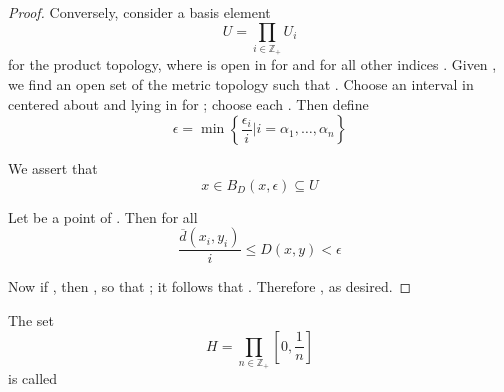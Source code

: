 \begin{proof}
      Conversely, consider a basis element
      \begin{equation*}
            U = \prod_{i \in \mathbb{Z}_{+}} U_{i}
      \end{equation*}
      for the product topology, where  is open in  for  and  for all other indices . Given , we find an open set  of the metric topology such that . Choose an interval  in  centered about  and lying in  for ; choose each . Then define
      \begin{equation*}
            \epsilon = \min \left\{
                  \frac{\epsilon_{i}}{i} | i = \alpha_{1},\dots,\alpha_{n}
            \right\}
      \end{equation*}

      We assert that
      \begin{equation*}
            x \in B_{D}(x,\epsilon) \subseteq U
      \end{equation*}

      Let  be a point of . Then for all 
      \begin{equation*}
            \frac{\overline{d}(x_{i},y_{i})}{i} \le D(x,y) < \epsilon
      \end{equation*}

      Now if , then , so that ; it follows that . Therefore , as desired.

\end{proof}

\begin{definition}\label{def:HilbertCube}
      The set
      \begin{equation*}
            H = \prod_{
                  n \in \mathbb{Z}_{+}
            } [0,\frac{1}{n}]
      \end{equation*}
      is called 
\end{definition}

